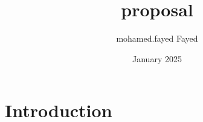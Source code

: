 \documentclass{article}
\title{proposal}
\author{mohamed.fayed Fayed}
\date{January 2025}
\begin{document}
\maketitle

\section{Introduction}
\end{document}
